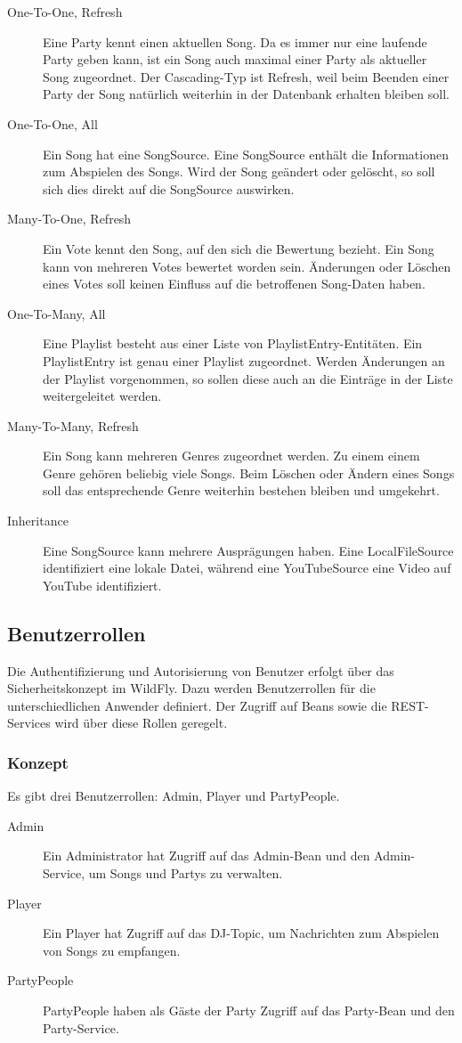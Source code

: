 \begin{description}
	\item[One-To-One, Refresh] Eine Party kennt einen aktuellen Song. Da es immer nur eine laufende Party geben kann, ist ein Song auch maximal einer Party als aktueller Song zugeordnet. Der Cascading-Typ ist Refresh, weil beim Beenden einer Party der Song natürlich weiterhin in der Datenbank erhalten bleiben soll.
	\item[One-To-One, All] Ein Song hat eine SongSource. Eine SongSource enthält die Informationen zum Abspielen des Songs. Wird der Song geändert oder gelöscht, so soll sich dies direkt auf die SongSource auswirken.
	\item[Many-To-One, Refresh] Ein Vote kennt den Song, auf den sich die Bewertung bezieht. Ein Song kann von mehreren Votes bewertet worden sein. Änderungen oder Löschen eines Votes soll keinen Einfluss auf die betroffenen Song-Daten haben.
	\item[One-To-Many, All] Eine Playlist besteht aus einer Liste von PlaylistEntry-Entitäten. Ein PlaylistEntry ist genau einer Playlist zugeordnet. Werden Änderungen an der Playlist vorgenommen, so sollen diese auch an die Einträge
	in der Liste weitergeleitet werden.
	\item[Many-To-Many, Refresh] Ein Song kann mehreren Genres zugeordnet werden. Zu einem einem Genre gehören beliebig viele Songs. Beim Löschen oder Ändern eines Songs soll das entsprechende Genre weiterhin bestehen bleiben und umgekehrt.
	\item[Inheritance] Eine SongSource kann mehrere Ausprägungen haben. Eine LocalFileSource identifiziert eine lokale Datei, während eine YouTubeSource eine Video auf YouTube identifiziert.
\end{description}



\subsection{Benutzerrollen}
\label{sec:Benutzerrollen}
Die Authentifizierung und Autorisierung von Benutzer erfolgt über das Sicherheitskonzept im WildFly. Dazu werden Benutzerrollen für die unterschiedlichen Anwender definiert. Der Zugriff auf Beans sowie die REST-Services wird über diese Rollen geregelt. 

\subsubsection{Konzept}
Es gibt drei Benutzerrollen: Admin, Player und PartyPeople.
\begin{description}
	\item[Admin] Ein Administrator hat Zugriff auf das Admin-Bean und den Admin-Service, um Songs und Partys zu verwalten.
	\item[Player] Ein Player hat Zugriff auf das DJ-Topic, um Nachrichten zum Abspielen von Songs zu empfangen.
	\item[PartyPeople] PartyPeople haben als Gäste der Party Zugriff auf das Party-Bean und den Party-Service.
\end{description}

